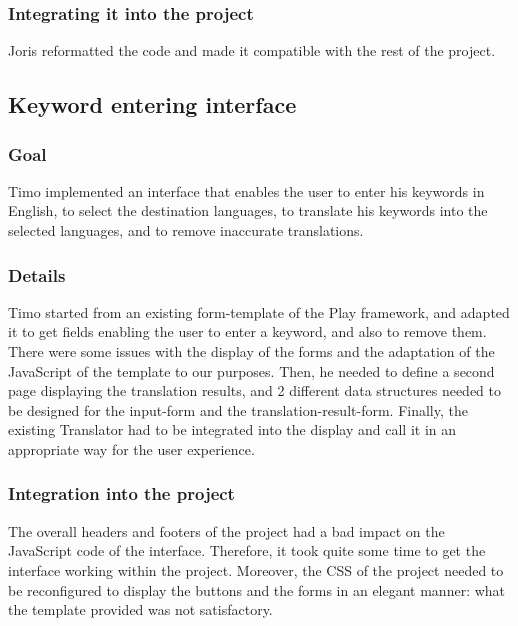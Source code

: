 \subsubsection{Integrating it into the project}

Joris reformatted the code and made it compatible with the rest of the project.

\subsection{Keyword entering interface}

\subsubsection{Goal}
Timo implemented an interface that enables the user to enter his keywords in English, to select the destination languages, to translate his keywords into the selected languages, and to remove inaccurate translations.

\subsubsection{Details}
Timo started from an existing form-template of the Play framework, and adapted it to get fields enabling the user to enter a keyword, and also to remove them. There were some issues with the display of the forms and the adaptation of the JavaScript of the template to our purposes. Then, he needed to define a second page displaying the translation results, and 2 different data structures needed to be designed for the input-form and the translation-result-form. Finally, the existing Translator had to be integrated into the display and call it in an appropriate way for the user experience.

\subsubsection{Integration into the project}
The overall headers and footers of the project had a bad impact on the JavaScript code of the interface. Therefore, it took quite some time to get the interface working within the project. Moreover, the CSS of the project needed to be reconfigured to display the buttons and the forms in an elegant manner: what the template provided was not satisfactory.
